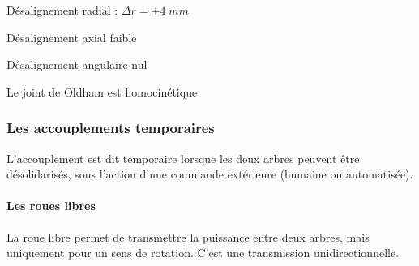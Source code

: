 \documentclass[11pt,oneside]{article}
\begin{document}
Désalignement radial : 
$\Delta r = \pm 4\; mm$

Désalignement axial faible

Désalignement angulaire nul

Le joint de Oldham est homocinétique


\subsubsection{Les accouplements temporaires}
L’accouplement est dit temporaire lorsque les deux arbres peuvent être désolidarisés, sous l’action d’une commande extérieure (humaine ou automatisée).

\paragraph{Les roues libres}

La roue libre permet de transmettre la puissance entre deux arbres, mais uniquement pour un sens de rotation. C’est une transmission unidirectionnelle.
\end{document}
